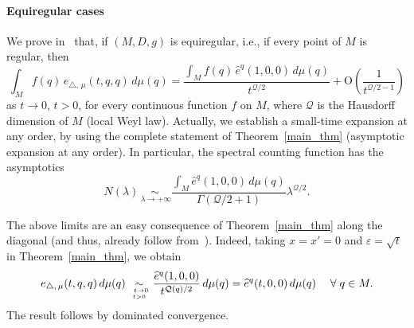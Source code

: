 \documentclass[10pt]{amsart}
\theoremstyle{definition}\newtheorem{defi}[theo]{Definition}\newtheorem{rema}[theo]{Remark}\newtheorem{exam}[theo]{Example}\newtheorem{exem}[theo]{Example}\newtheorem{nota}[theo]{Notation}
\newcommand{\calQ}{\mathcal{Q}}
\newcommand{\rmO}{\mathrm{O}}
\let\oldforall\forall
\renewcommand*{\forall}{\mathrel{\oldforall}}
\begin{document}
\goodbreak
\paragraph{Equiregular cases}
We prove in~\cite{CHT-II} that, if $(M,D,g)$ is equiregular, i.e., if every point of $M$ is regular, then
\[
\int_M f(q)\, e_{\triangle,\,\mu}(t,q,q) \, d\mu (q) = \frac{\int _M f(q)\, \widehat{e}^{q}(1,0,0) \, d\mu(q)}{t^{\calQ/2}} + \rmO\left(\frac{1}{t^{\calQ/2-1}} \right)
\]
as $t\rightarrow 0$, $t>0$, for every continuous function $f$ on $M$, where $\calQ$ is the Hausdorff dimension of $M$ (local Weyl law). Actually, we establish a small-time expansion at any order, by using the complete statement of Theorem~\ref{main_thm} (asymptotic expansion at any order). In particular, the spectral counting function has the asymptotics
\[
N(\lambda) \underset{\ \lambda\rightarrow+\infty}{\sim} \frac{\int_M \widehat{e}^{q}(1,0,0) \, d\mu(q)}{\Gamma(\calQ/2+1)} \lambda^{\calQ/2}.
\]
\goodbreak

The above limits are an easy consequence of Theorem~\ref{main_thm} along the diagonal (and thus, already follow from~\cite{BenArous_AIF1989,Metivier1976}). Indeed, taking $x=x'=0$ and $\varepsilon=\sqrt{t}$ in Theorem~\ref{main_thm}, we obtain
\[
e_{\triangle,\,\mu}(t,q,q)\, d\mu(q) \underset{\ t\rightarrow 0\atop t>0}{\sim} \frac{\widehat{e}^{q}(1,0,0)}{t^{\calQ(q)/2}}\, d\mu(q) = \widehat{e}^{q}(t,0,0) \, d\mu(q) \quad \forall q\in M.
\]
The result follows by dominated convergence.
\end{document}
